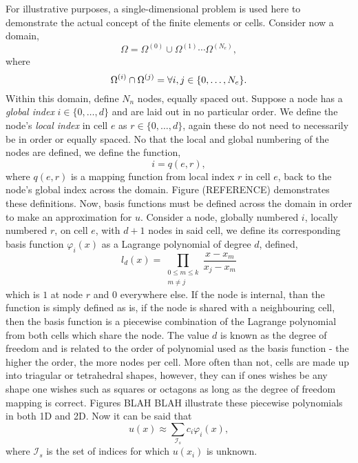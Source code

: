 For illustrative purposes, a single-dimensional problem is used here to demonstrate the actual concept of the finite elements or cells. Consider now a domain,
\begin{equation}
	\Omega = \Omega^{(0)}\cup\Omega^{(1)}\cdots\Omega^{(N_e)},
\end{equation}
where 
\begin{equation}
	\Omega^{(i)}\cap\Omega^{(j)} = \null \forall i,j \in \{0,\dots,N_e\}.
\end{equation}
Within this domain, define $N_n$ nodes, equally spaced out. Suppose a node has a \textit{global index} $i \in \{0,\dots,d\}$ and are laid out in no particular order. We define the node's \textit{local index} in cell $e$ as $r \in \{0,\dots,d\}$, again these do not need to necessarily be in order or equally spaced. No that the local and global numbering of the nodes are defined, we define the function,
\begin{equation}
	i = q(e,r),
\end{equation}
where $q(e,r)$ is a mapping function from local index $r$ in cell $e$, back to the node's global index across the domain. Figure (REFERENCE) demonstrates these definitions. Now, basis functions must be defined across the domain in order to make an approximation for $u$. Consider a node, globally numbered $i$, locally numbered $r$, on cell $e$, with $d+1$ nodes in said cell, we define its corresponding basis function $\varphi_i(x)$ as a Lagrange polynomial of degree $d$, defined,
\begin{equation}
	l_d(x) = \prod_{\substack{0\leq m\leq k \\ m\neq j}}\frac{x-x_m}{x_j-x_m} 
\end{equation}
which is $1$ at node $r$ and $0$ everywhere else. If the node is internal, than the function is simply defined as is, if the node is shared with a neighbouring cell, then the basis function is a piecewise combination of the Lagrange polynomial from both cells which share the node. The value $d$ is known as the degree of freedom and is related to the order of polynomial used as the basis function - the higher the order, the more nodes per cell. More often than not, cells are made up into triagular or tetrahedral shapes, however, they can if ones wishes be any shape one wishes such as squares or octagons as long as the degree of freedom mapping is correct. Figures BLAH BLAH illustrate these piecewise polynomials in both 1D and 2D. Now it can be said that
\begin{equation}
	u(x) \approx \sum_{\mathcal{I}_s} c_i \varphi_i(x),
\end{equation}
where $\mathcal{I}_s$ is the set of indices for which $u(x_i)$ is unknown.

